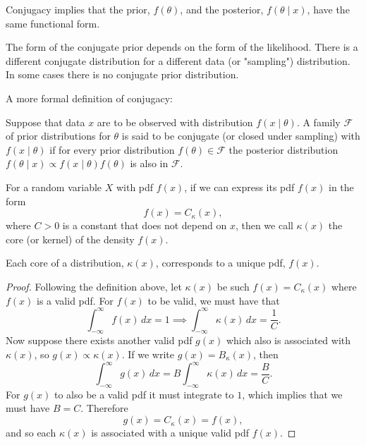 \documentclass[10pt, a4paper]{article}
\begin{document}
Conjugacy implies that the prior,
$f(\theta)$,
and the posterior,
$f(\theta \mid x)$,
have the same functional form.

The form of the conjugate prior depends on the form of the likelihood.
There is a different conjugate distribution for a different data
(or "sampling")
distribution.
In some cases there is no conjugate prior distribution.

\begin{remark}
    A more formal definition of conjugacy:

    Suppose that data $x$ are to be observed with distribution $f(x \mid \theta)$.
    A family $\mathcal{F}$ of prior distributions for $\theta$ is said to be conjugate
    (or closed under sampling)
    with $f(x \mid \theta)$ if for every prior distribution $f(\theta) \in \mathcal{F}$ the posterior distribution $f(\theta \mid x) \propto f(x \mid \theta)f(\theta)$ is also in $\mathcal{F}$.
\end{remark}

\begin{definition}
    For a random variable $X$ with pdf $f(x)$,
    if we can express its pdf $f(x)$ in the form
    \[
    f(x) = C_{\kappa}(x),
    \]
    where $C > 0$ is a constant that does not depend on $x$,
    then we call $\kappa(x)$ the core
    (or kernel)
    of the density $f(x)$.
\end{definition}

\begin{lemma}
    Each core of a distribution,
    $\kappa(x)$,
    corresponds to a unique pdf,
    $f(x)$.

    \begin{proof}
        Following the definition above,
        let $\kappa(x)$ be such $f(x) = C_{\kappa}(x)$ where $f(x)$ is a valid pdf.
        For $f(x)$ to be valid,
        we must have that
        \[
        \int_{-\infty}^{\infty}f(x)\,dx = 1 \implies \int_{-\infty}^{\infty}\kappa(x)\,dx = \frac{1}{C}.
        \]
        Now suppose there exists another valid pdf $g(x)$ which also is associated with $\kappa(x)$,
        so $g(x) \propto \kappa(x)$.
        If we write $g(x) = B_{\kappa}(x)$,
        then
        \[
        \int_{-\infty}^{\infty}g(x)\,dx = B\int_{-\infty}^{\infty}\kappa(x)\,dx = \frac{B}{C}.
        \]
        For $g(x)$ to also be a valid pdf it must integrate to $1$,
        which implies that we must have $B = C$.
        Therefore
        \[
        g(x) = C_{\kappa}(x) = f(x),
        \]
        and so each $\kappa(x)$ is associated with a unique valid pdf $f(x)$.
    \end{proof}
\end{lemma}
\end{document}
